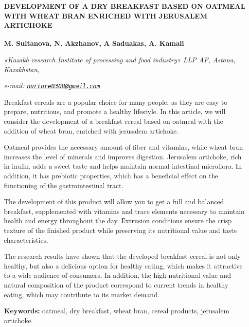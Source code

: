 \begin{articleheader}
{\bfseries DEVELOPMENT OF A DRY BREAKFAST BASED ON OATMEAL WITH WHEAT BRAN ENRICHED WITH JERUSALEM ARTICHOKE}

{\bfseries
M. Sultanova,
N. Akzhanov\textsuperscript{\envelope },
A Saduakas,
A. Kamali}
\end{articleheader}

\begin{affiliation}
\emph{«Kazakh research Institute of processing and food industry» LLP AF, Astana, Kazakhstan,}

\emph{e-mail: \href{mailto:nurtore0308@gmail.com}{\nolinkurl{nurtore0308@gmail.com}}}
\end{affiliation}

Breakfast cereals are a popular choice for many people, as they are easy
to prepare, nutritious, and promote a healthy lifestyle. In this
article, we will consider the development of a breakfast cereal based on
oatmeal with the addition of wheat bran, enriched with jerusalem
artichoke.

Oatmeal provides the necessary amount of fiber and vitamins, while wheat
bran increases the level of minerals and improves digestion. Jerusalem
artichoke, rich in inulin, adds a sweet taste and helps maintain normal
intestinal microflora. In addition, it has prebiotic properties, which
has a beneficial effect on the functioning of the gastrointestinal
tract.

The development of this product will allow you to get a full and
balanced breakfast, supplemented with vitamins and trace elements
necessary to maintain health and energy throughout the day. Еxtrusion
conditions ensure the crisp texture of the finished product while
preserving its nutritional value and taste characteristics.

The research results have shown that the developed breakfast cereal is
not only healthy, but also a delicious option for healthy eating, which
makes it attractive to a wide audience of consumers. In addition, the
high nutritional value and natural composition of the product correspond
to current trends in healthy eating, which may contribute to its market
demand.

{\bfseries Keywords:} oatmeal, dry breakfast, wheat bran, cereal products,
jerusalem artichoke.

